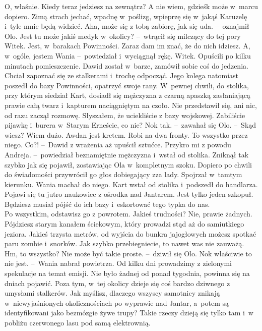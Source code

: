 \documentclass[../MAIN.tex]{subfiles}
\begin{document}
\xx O, właśnie. Kiedy teraz jedziesz na zewnątrz?
\xx A nie wiem, gdzieś\3k może w~marcu dopiero. Zimą strach jechać, wpadnę w~poślizg, wpieprzę się w~jakąś Karuzelę i~tyle mnie będą widzieć.
\xx Aha, może się z tobą zabiorę, jak się uda. --~oznajmił Olo.
\xx Jest tu może jakiś medyk w~okolicy? --~wtrącił się milczący do tej pory Witek.
\xx Jest, w~barakach Powinności. Zaraz dam im znać, że do nich idziesz. A, w~ogóle, jestem Wania --~powiedział i~wyciągnął rękę.
\xx Witek.
\qd
\hspace{4.5em}Opuścili po kilku minutach pomieszczenie. Dawid został w~barze, zamówił sobie coś do jedzenia. Chciał zapoznać się ze stalkerami i~trochę odpocząć. Jego kolega natomiast poszedł do bazy Powinności, opatrzyć swoje rany. W~pewnej chwili, do stolika, przy którym siedział Kart, dosiadł się mężczyzna z czarną apaszką zasłaniającą prawie całą twarz i~kapturem naciągniętym na czoło. Nie przedstawił się, ani nic, od razu zaczął rozmowę.
\sx Słyszałem, że uciekliście z bazy wojskowej. Zabiliście pijawkę i~burera w~Starym Erneście, co nie?
\xx No\3k tak. --~zawahał się Olo. --~Skąd wiesz?
\xx Wiem dużo. Awdan jest kretem. Robi na dwa fronty. To wszystko przez niego.
\xx Co?! --~Dawid z wrażenia aż upuścił sztućce.
\xx Przykro mi z powodu Andreja. --~powiedział beznamiętnie mężczyzna i~wstał od stolika.
\qd \mm
Zniknął tak szybko jak się pojawił, zostawiając Ola w~kompletnym szoku. Dopiero po chwili do świadomości przywrócił go głos dobiegający zza lady. Spojrzał w~tamtym kierunku. Wania machał do niego. Kart wstał od stolika i~podszedł do handlarza.
\sx Pojawi się tu jutro naukowiec z ośrodka nad Jantarem. Jest tylko jeden szkopuł. Będziesz musiał pójść do ich bazy i~eskortować tego typka do nas.\\
Po wszystkim, odstawisz go z powrotem.
\xx Jakieś trudności?
\xx Nie, prawie żadnych. Pójdziesz starym kanałem ściekowym, który prowadzi stąd aż do samiutkiego jeziora. Jakieś trzysta metrów, od wyjścia do bunkra jajogłowych możesz spotkać paru zombie i~snorków. Jak szybko przebiegniecie, to nawet was nie zauważą.
\xx Hm, to wszystko? Nie może być takie proste. --~dziwił się Olo.
\xx No\3k właściwie to nie jest. --~Wania nabrał powietrza. \xx Od kilku dni prowadzimy z zielonymi spekulacje na temat emisji. Nie było żadnej od ponad tygodnia, powinna się na dniach pojawić. Poza tym, w~tej okolicy dzieje się coś bardzo dziwnego z umysłami stalkerów. Jak myślisz, dlaczego wszyscy samotnicy znikają w~niewyjaśnionych okolicznościach po wyprawie nad Jantar, a~potem są identyfikowani jako bezmózgie żywe trupy? Takie rzeczy dzieją się tylko tam i~w pobliżu czerwonego lasu pod samą elektrownią.
\end{document}
